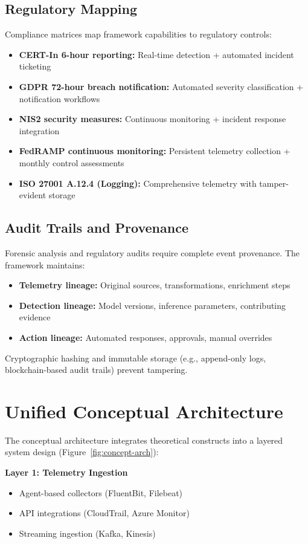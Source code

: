 \subsection{Regulatory Mapping}
Compliance matrices map framework capabilities to regulatory controls:
\begin{itemize}
    \item \textbf{CERT-In 6-hour reporting:} Real-time detection + automated incident ticketing
    \item \textbf{GDPR 72-hour breach notification:} Automated severity classification + notification workflows
    \item \textbf{NIS2 security measures:} Continuous monitoring + incident response integration
    \item \textbf{FedRAMP continuous monitoring:} Persistent telemetry collection + monthly control assessments
    \item \textbf{ISO 27001 A.12.4 (Logging):} Comprehensive telemetry with tamper-evident storage
\end{itemize}

\subsection{Audit Trails and Provenance}
Forensic analysis and regulatory audits require complete event provenance. The framework maintains:
\begin{itemize}
    \item \textbf{Telemetry lineage:} Original sources, transformations, enrichment steps
    \item \textbf{Detection lineage:} Model versions, inference parameters, contributing evidence
    \item \textbf{Action lineage:} Automated responses, approvals, manual overrides
\end{itemize}

Cryptographic hashing and immutable storage (e.g., append-only logs, blockchain-based audit trails) prevent tampering.

\section{Unified Conceptual Architecture}\label{sec:theory-arch}
The conceptual architecture integrates theoretical constructs into a layered system design (Figure~\ref{fig:concept-arch}):

\textbf{Layer 1: Telemetry Ingestion}
\begin{itemize}
    \item Agent-based collectors (FluentBit, Filebeat)
    \item API integrations (CloudTrail, Azure Monitor)
    \item Streaming ingestion (Kafka, Kinesis)
\end{itemize}

